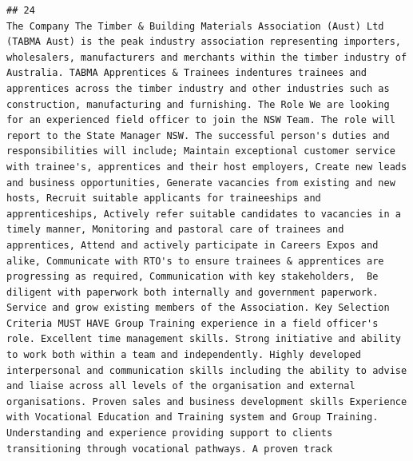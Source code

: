 \documentclass[11pt,a4paper,]{article}
\begin{document}
\begin{verbatim}
## 24                                                                                                                                                                                                                                                                                                                                                                                                                                                                                                                                                                                                                                                                                                                                                                                                                                                                                                                                                                                                                                                                                                                                                                                                                                                                                                                                                                                                                                                                                                               The Company The Timber & Building Materials Association (Aust) Ltd (TABMA Aust) is the peak industry association representing importers, wholesalers, manufacturers and merchants within the timber industry of Australia. TABMA Apprentices & Trainees indentures trainees and apprentices across the timber industry and other industries such as construction, manufacturing and furnishing. The Role We are looking for an experienced field officer to join the NSW Team. The role will report to the State Manager NSW. The successful person's duties and responsibilities will include; Maintain exceptional customer service with trainee's, apprentices and their host employers, Create new leads and business opportunities, Generate vacancies from existing and new hosts, Recruit suitable applicants for traineeships and apprenticeships, Actively refer suitable candidates to vacancies in a timely manner, Monitoring and pastoral care of trainees and apprentices, Attend and actively participate in Careers Expos and alike, Communicate with RTO's to ensure trainees & apprentices are progressing as required, Communication with key stakeholders,  Be diligent with paperwork both internally and government paperwork. Service and grow existing members of the Association. Key Selection Criteria MUST HAVE Group Training experience in a field officer's role. Excellent time management skills. Strong initiative and ability to work both within a team and independently. Highly developed interpersonal and communication skills including the ability to advise and liaise across all levels of the organisation and external organisations. Proven sales and business development skills Experience with Vocational Education and Training system and Group Training. Understanding and experience providing support to clients transitioning through vocational pathways. A proven track 
\end{verbatim}
\end{document}
